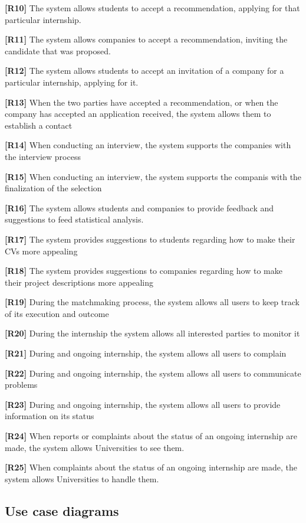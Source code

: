 \textbf{[R10]} The system allows students to accept a recommendation, applying for that particular internship. 

\textbf{[R11]} The system allows companies to accept a recommendation, inviting the candidate that was proposed.

\textbf{[R12]} The system allows students to accept an invitation of a company for a particular internship, applying for it.

\textbf{[R13]}  When the two parties have accepted a recommendation, or when the company has accepted an application received, the system allows them to establish a contact

\textbf{[R14]} When conducting an interview, the system supports the companies with the interview process

\textbf{[R15]} When conducting an interview, the system supports the companis with the finalization of the selection

\textbf{[R16]} The system allows students and companies to provide feedback and suggestions to feed statistical analysis.

\textbf{[R17] }The system provides suggestions to students regarding how to make their CVs more appealing

\textbf{[R18]} The system provides suggestions to companies regarding how to make their project descriptions more appealing

\textbf{[R19]} During the matchmaking process, the system allows all users to keep track of its execution and outcome

\textbf{[R20]} During the internship the system allows all interested parties to monitor it

\textbf{[R21]} During and ongoing internship, the system allows all users to complain 

\textbf{[R22]} During and ongoing internship, the system allows all users to communicate problems 

\textbf{[R23]} During and ongoing internship, the system allows all users to provide information on its status

\textbf{[R24]} When reports or complaints about the status of an ongoing internship are made, the system allows Universities to see them.

\textbf{[R25]} When complaints about the status of an ongoing internship are made, the system allows Universities to handle them.

\pagebreak

\subsection{Use case diagrams}

